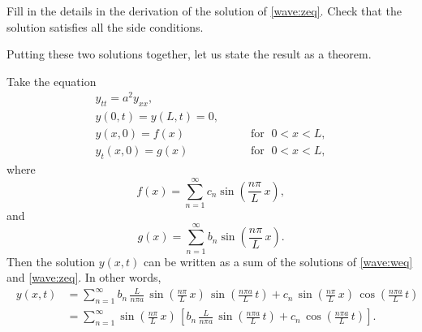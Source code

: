 \documentclass[12pt]{book}
\begin{document}
\begin{exercise}
Fill in the details in the derivation of the solution of \eqref{wave:zeq}.
Check that the solution satisfies all the side conditions.
\end{exercise}

Putting these two solutions together, let us state the result as a theorem.
\begin{theorem}
Take the equation
\begin{equation} \label{wave:tyeq}
\begin{array}{ll}
y_{tt} = a^2 y_{xx} , &  \\
y(0,t) = y(L,t) = 0 , &  \\
y(x,0) = f(x) & \qquad \text{for } \; 0 < x < L , \\
y_t(x,0) = g(x) & \qquad \text{for } \; 0 < x < L ,
\end{array}
\end{equation}
where
\begin{equation*}
f(x) =
\sum_{n=1}^\infty c_n \sin \left( \frac{n \pi}{L} \, x \right) ,
\end{equation*}
and
\begin{equation*}
g(x) =
\sum_{n=1}^\infty b_n \sin \left( \frac{n \pi}{L} \, x \right) .
\end{equation*}
Then the solution $y(x,t)$ can be written as a sum of the solutions
of \eqref{wave:weq} and \eqref{wave:zeq}.  In other words,
\begin{equation*}
\boxed{~~
\begin{aligned}
y(x,t)
& =
\sum_{n=1}^\infty
b_n \,
\frac{L}{n \pi a} \,
\sin \left( \frac{n \pi}{L} \, x \right) \,
\sin \left( \frac{n \pi a}{L} \, t \right) 
+
c_n \,
\sin \left( \frac{n \pi}{L} \, x \right) \,
\cos \left( \frac{n \pi a}{L} \, t \right) 
\\
& =
\sum_{n=1}^\infty
\sin \left( \frac{n \pi}{L} \, x \right) \,
\left[
b_n \,
\frac{L}{n \pi a} \,
\sin \left( \frac{n \pi a}{L} \, t \right) 
+
c_n \,
\cos \left( \frac{n \pi a}{L} \, t \right) 
\right] .
\end{aligned}
~~}
\end{equation*}
\end{theorem}
\end{document}
